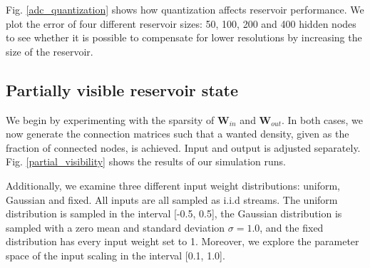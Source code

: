 Fig. \ref{adc_quantization} shows how quantization affects reservoir
performance. We plot the error of four different reservoir sizes: 50, 100, 200
and 400 hidden nodes to see whether it is possible to compensate for lower
resolutions by increasing the size of the reservoir.

\subsection{Partially visible reservoir state}

We begin by experimenting with the sparsity of $\mathbf{W}_{in}$ and
$\mathbf{W}_{out}$. In both cases, we now generate the connection matrices such
that a wanted density, given as the fraction of connected nodes, is
achieved. Input and output is adjusted separately. Fig. \ref{partial_visibility}
shows the results of our simulation runs.

Additionally, we examine three different input weight distributions: uniform,
Gaussian and fixed. All inputs are all sampled as i.i.d streams. The uniform
distribution is sampled in the interval [-0.5, 0.5], the Gaussian distribution
is sampled with a zero mean and standard deviation $\sigma = 1.0$, and the fixed
distribution has every input weight set to 1. Moreover, we explore the parameter
space of the input scaling in the interval [0.1, 1.0].

